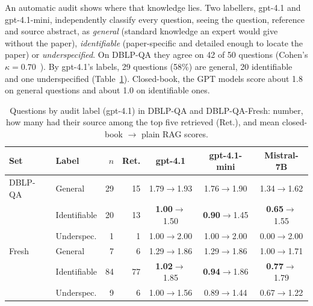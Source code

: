 \documentclass[conference]{IEEEtran}
\newcommand{\dq}{DBLP-QA}
\newcommand{\fresh}{DBLP-QA-Fresh}
\begin{document}
An automatic audit shows where that knowledge lies. Two labellers, gpt-4.1 and gpt-4.1-mini,
independently classify every question, seeing the question, reference and source abstract, as
\emph{general} (standard knowledge an expert would give without the paper), \emph{identifiable}
(paper-specific and detailed enough to locate the paper) or \emph{underspecified}. On \dq{} they agree on
42 of 50 questions (Cohen's $\kappa=0.70$~\cite{cohen1960kappa}). By gpt-4.1's labels, 29 questions
(58\%) are general, 20 identifiable and one underspecified (Table~\ref{tab:audit}). Closed-book, the GPT
models score about 1.8 on general questions and about 1.0 on identifiable ones.

\begin{table}[t]
\caption{Questions by audit label (gpt-4.1) in \dq{} and \fresh{}: number, how many had their source among
the top five retrieved (Ret.), and mean closed-book $\rightarrow$ plain RAG scores.}
\label{tab:audit}
\centering\scriptsize
\setlength{\tabcolsep}{2.2pt}
\begin{tabular}{llrrccc}
\toprule
Set & Label & $n$ & Ret. & gpt-4.1 & gpt-4.1-mini & Mistral-7B \\
\midrule
\dq{} & General & 29 & 15 & 1.79$\rightarrow$1.93 & 1.76$\rightarrow$1.90 & 1.34$\rightarrow$1.62 \\
 & Identifiable & 20 & 13 & \textbf{1.00}$\rightarrow$1.50 & \textbf{0.90}$\rightarrow$1.45 & \textbf{0.65}$\rightarrow$1.55 \\
 & Underspec. & 1 & 1 & 1.00$\rightarrow$2.00 & 1.00$\rightarrow$2.00 & 0.00$\rightarrow$2.00 \\
\midrule
Fresh & General & 7 & 6 & 1.29$\rightarrow$1.86 & 1.29$\rightarrow$1.86 & 1.00$\rightarrow$1.71 \\
 & Identifiable & 84 & 77 & \textbf{1.02}$\rightarrow$1.85 & \textbf{0.94}$\rightarrow$1.86 & \textbf{0.77}$\rightarrow$1.79 \\
 & Underspec. & 9 & 6 & 1.00$\rightarrow$1.56 & 0.89$\rightarrow$1.44 & 0.67$\rightarrow$1.22 \\
\bottomrule
\end{tabular}
\end{table}
\end{document}
